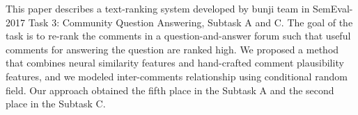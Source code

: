 This paper describes a text-ranking system developed by bunji team in SemEval-2017 Task 3: Community Question Answering, Subtask A and C. The goal of the task is to re-rank the comments in a question-and-answer forum such that useful comments for answering the question are ranked high. We proposed a method that combines neural similarity features and hand-crafted comment plausibility features, and we modeled inter-comments relationship using conditional random field. Our approach obtained the fifth place in the Subtask A and the second place in the Subtask C.
